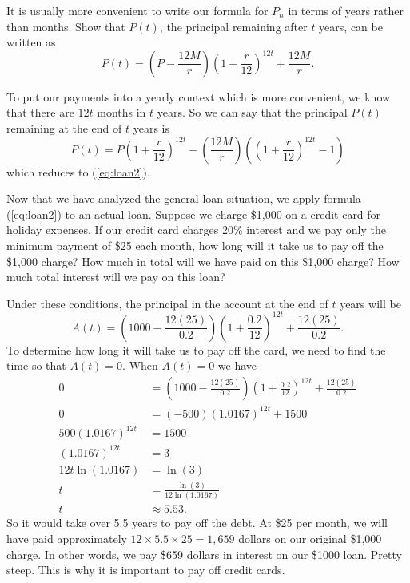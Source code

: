 \begin{exercises}
\begin{exerciseSolution}
\end{exerciseSolution}

    \item It is usually more convenient to write our formula for $P_n$ in terms of years rather than months. Show that $P(t)$, the principal remaining after $t$ years, can be written as
\begin{equation} \label{eq:loan2}
P(t) = \left(P - \frac{12M}{r}\right)\left(1+\frac{r}{12}\right)^{12t} + \frac{12M}{r}.
\end{equation}

\begin{exerciseSolution}

To put our payments into a yearly context which is more convenient, we know that there are $12t$ months in $t$ years. So we can say that the principal $P(t)$ remaining at the end of $t$ years is
\begin{equation} \label{eq:loan1}
P(t) = P \left(1+\frac{r}{12}\right)^{12t} - \left(\frac{12M}{r}\right) \left( \left(1+\frac{r}{12}\right)^{12t} - 1\right)
\end{equation}
which reduces to (\ref{eq:loan2}).

\end{exerciseSolution}

    \item Now that we have analyzed the general loan situation, we apply formula (\ref{eq:loan2}) to an actual loan. Suppose we charge \$1,000 on a credit card for holiday expenses. If our credit card charges 20\% interest and we pay only the minimum payment of \$25 each month, how long will it take us to pay off the \$1,000 charge? How much in total will we have paid on this \$1,000 charge? How much total interest will we pay on this loan? 

\begin{exerciseSolution}
\vs

Under these conditions, the principal in the account at the end of $t$ years will be
 \[A(t) = \left(1000 - \frac{12(25)}{0.2}\right)\left(1+\frac{0.2}{12}\right)^{12t} + \frac{12(25)}{0.2}.\]
To determine how long it will take us to pay off the card, we need to find the time so that $A(t) = 0$. When $A(t) = 0$ we have
\begin{align*}
0 &= \left(1000 - \frac{12(25)}{0.2}\right)\left(1+\frac{0.2}{12}\right)^{12t} + \frac{12(25)}{0.2} \\
0	&= (-500)(1.0167)^{12t} + 1500 \\
500(1.0167)^{12t} &= 1500 \\
(1.0167)^{12t} &= 3 \\
12t \ln(1.0167) &= \ln(3) \\
t &= \frac{\ln(3)}{12 \ln(1.0167)} \\
t &\approx 5.53.
\end{align*}
So it would take over 5.5 years to pay off the debt. At \$25 per month, we will have paid approximately $12 \times 5.5 \times 25 = 1,659$ dollars on our original \$1,000 charge. In other words, we pay \$659 dollars in interest on our \$1000 loan. Pretty steep. This is why it is important to pay off credit cards.


\end{exerciseSolution}
\end{exercises}
